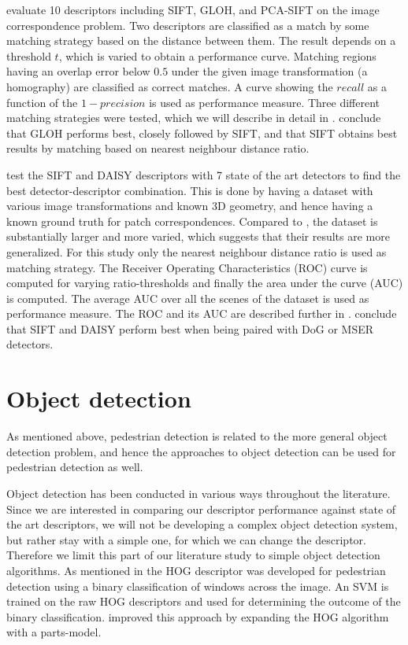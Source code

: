 \documentclass[thesis.tex]{subfiles}
\begin{document}
\citet{mikolajczyk2005performance} evaluate 10 descriptors including SIFT, GLOH, and PCA-SIFT on the image correspondence problem. Two descriptors are classified as a match by some matching strategy based on the distance between them. The result depends on a threshold $t$, which is varied to obtain a performance curve. Matching regions having an overlap error below $0.5$ under the given image transformation (a homography) are classified as correct matches. A curve showing the $recall$ as a function of the $1-precision$ is used as performance measure. Three different matching strategies were tested, which we will describe in detail in . \citet{mikolajczyk2005performance} conclude that GLOH performs best, closely followed by SIFT, and that SIFT obtains best results by matching based on nearest neighbour distance ratio.

\citet{dahl2011finding} test the SIFT and DAISY descriptors with 7 state of the art detectors to find the best detector-descriptor combination. This is done by having a dataset with various image transformations and known 3D geometry, and hence having a known ground truth for patch correspondences. Compared to \citet{mikolajczyk2005performance}, the dataset is substantially larger and more varied, which suggests that their results are more generalized. For this study only the nearest neighbour distance ratio is used as matching strategy. The Receiver Operating Characteristics (ROC) curve is computed for varying ratio-thresholds and finally the area under the curve (AUC) is computed. The average AUC over all the scenes of the dataset is used as performance measure. The ROC and its AUC are described further in . \citet{dahl2011finding} conclude that SIFT and DAISY perform best when being paired with DoG or MSER detectors.
%
\section{Object detection}
%
As mentioned above, pedestrian detection is related to the more general object detection problem, and hence the approaches to object detection can be used for pedestrian detection as well.

Object detection has been conducted in various ways throughout the literature. Since we are interested in comparing our descriptor performance against state of the art descriptors, we will not be developing a complex object detection system, but rather stay with a simple one, for which we can change the descriptor. Therefore we limit this part of our literature study to simple object detection algorithms. As mentioned in  the HOG descriptor \cite{dalal2005histograms} was developed for pedestrian detection using a binary classification of windows across the image. An SVM is trained on the raw HOG descriptors and used for determining the outcome of the binary classification. \citet{felzenszwalb2008discriminatively} improved this approach by expanding the HOG algorithm with a parts-model.
\end{document}
